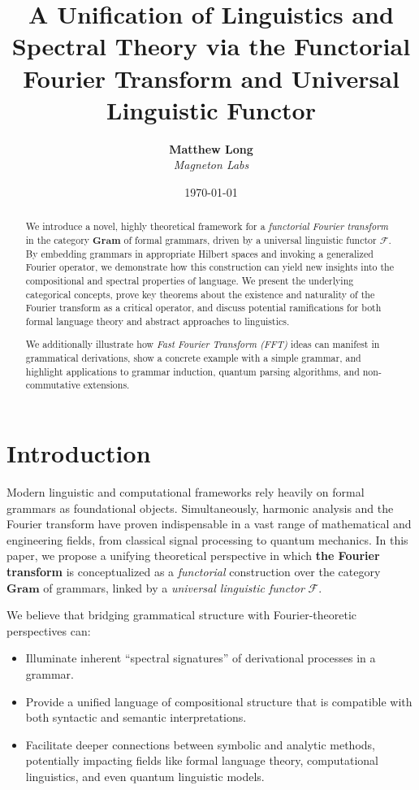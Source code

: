 \documentclass[11pt]{article}
\title{\textbf{A Unification of Linguistics and Spectral Theory via the Functorial Fourier Transform and Universal Linguistic Functor}}
\author{
  \textbf{Matthew Long}\\
  \textit{Magneton Labs}
}
\date{\today}
\begin{document}
\maketitle

\begin{abstract}
We introduce a novel, highly theoretical framework for a \emph{functorial Fourier transform} in the category \(\mathbf{Gram}\) of formal grammars, driven by a universal linguistic functor \(\mathcal{F}\). By embedding grammars in appropriate Hilbert spaces and invoking a generalized Fourier operator, we demonstrate how this construction can yield new insights into the compositional and spectral properties of language. We present the underlying categorical concepts, prove key theorems about the existence and naturality of the Fourier transform as a critical operator, and discuss potential ramifications for both formal language theory and abstract approaches to linguistics. 

We additionally illustrate how \emph{Fast Fourier Transform (FFT)} ideas can manifest in grammatical derivations, show a concrete example with a simple grammar, and highlight applications to grammar induction, quantum parsing algorithms, and non-commutative extensions.
\end{abstract}

\tableofcontents

\section{Introduction}

Modern linguistic and computational frameworks rely heavily on formal grammars as foundational objects. Simultaneously, harmonic analysis and the Fourier transform have proven indispensable in a vast range of mathematical and engineering fields, from classical signal processing to quantum mechanics. In this paper, we propose a unifying theoretical perspective in which \textbf{the Fourier transform} is conceptualized as a \emph{functorial} construction over the category \(\mathbf{Gram}\) of grammars, linked by a \emph{universal linguistic functor} \(\mathcal{F}\). 

We believe that bridging grammatical structure with Fourier-theoretic perspectives can:
\begin{itemize}
    \item Illuminate inherent ``spectral signatures'' of derivational processes in a grammar.
    \item Provide a unified language of compositional structure that is compatible with both syntactic and semantic interpretations.
    \item Facilitate deeper connections between symbolic and analytic methods, potentially impacting fields like formal language theory, computational linguistics, and even quantum linguistic models.
\end{itemize}
\end{document}
